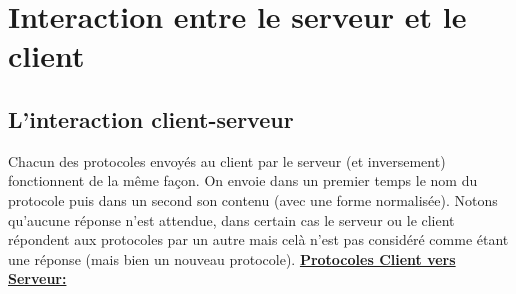 \documentclass[a4paper,12pt]{report}
\begin{document}
  \chapter{Interaction entre le serveur et le client}

    \section{L'interaction client-serveur}
    Chacun des protocoles envoyés au client par le serveur (et inversement) fonctionnent de la même façon. On envoie dans un premier temps le nom du protocole puis dans un second son contenu (avec une forme normalisée). Notons qu'aucune réponse n'est attendue, dans certain cas le serveur ou le client répondent aux protocoles par un autre mais celà n'est pas considéré comme étant une réponse (mais bien un nouveau protocole).
    \bigbreak
    \underline{\textbf{Protocoles Client vers Serveur:}}
    \medbreak
\end{document}
